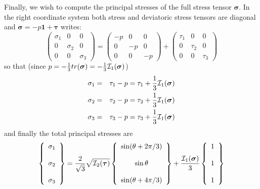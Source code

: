 Finally, we wish to compute the principal stresses of the full stress tensor ${\bm \sigma}$.
In the right coordinate system both stress and deviatoric stress tensors are diagonal and 
${\bm \sigma}=-p {\bm 1} + {\bm \tau}$ writes:
\[
\left(
\begin{array}{ccc}
\sigma_1 &0 &0 \\
0& \sigma_2 &0 \\
0&0 & \sigma_3  
\end{array}
\right)
=
\left(
\begin{array}{ccc}
-p&0&0\\
0&-p&0\\
0&0&-p
\end{array}
\right)
+
\left(
\begin{array}{ccc}
\tau_1 & 0&0 \\
0& \tau_2 & 0\\
0&0 & \tau_3  
\end{array}
\right)
\]
so that (since $p=-\frac{1}{3}tr({\bm \sigma})=-\frac{1}{3}{\cal I}_1({\bm \sigma})$) 
\begin{eqnarray}
\sigma_1 &=& \tau_1 - p = \tau_1 + \frac{1}{3}{\cal I}_1({\bm \sigma})\\ 
\sigma_2 &=& \tau_2 - p = \tau_2 + \frac{1}{3}{\cal I}_1({\bm \sigma})\\ 
\sigma_3 &=& \tau_3 - p = \tau_3 + \frac{1}{3}{\cal I}_1({\bm \sigma}) 
\end{eqnarray}
and finally the total principal stresses are
\begin{equation}
\left\{
\begin{array}{c}
\sigma_1 \\ \\
\sigma_2 \\ \\
\sigma_3
\end{array}
\right\}
= \frac{2  }{\sqrt{3}}\sqrt{ {\cal I}_2({\bm \tau})  }
\left\{
\begin{array}{c}
\sin (\theta + 2\pi/3)  \\ \\
\sin \theta   \\ \\
\sin (\theta + 4\pi/3  )
\end{array}
\right\}
+
\frac{{\cal I}_1({\bm \sigma})}{3}
\left\{
\begin{array}{c}
1 \\ \\
1 \\ \\
1
\end{array}
\right\}
\end{equation}
